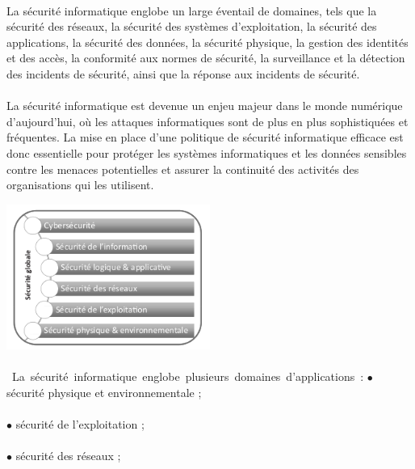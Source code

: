 \documentclass{report}
\begin{document}
 \paragraph{ } La sécurité informatique englobe un large éventail de domaines, tels que la sécurité des réseaux, la sécurité des systèmes d'exploitation, la sécurité des applications, la sécurité des données, la sécurité physique, la gestion des identités et des accès, la conformité aux normes de sécurité, la surveillance et la détection des incidents de sécurité, ainsi que la réponse aux incidents de sécurité.
 
 \paragraph{ }  La sécurité informatique est devenue un enjeu majeur dans le monde numérique d’aujourd’hui, où les attaques informatiques sont de plus en plus sophistiquées et fréquentes. La mise en place d'une politique de sécurité informatique efficace est donc essentielle pour protéger les systèmes informatiques et les données sensibles contre les menaces potentielles et assurer la continuité des activités des organisations qui les utilisent.
 \pagebreak
  
 \hbox{\includegraphics[width=0.5\textwidth]{image_sec.png}}
  \paragraph{ }
 \hbox{ La sécurité informatique englobe plusieurs domaines d'applications :}
 \vspace{5mm}
   \textendash \space $\bullet$ sécurité physique et environnementale ;
  \paragraph{ }
   \textendash \space $\bullet$ sécurité de l’exploitation ;
  \paragraph{ }
   \textendash \space $\bullet$ sécurité des réseaux ;
\end{document}
